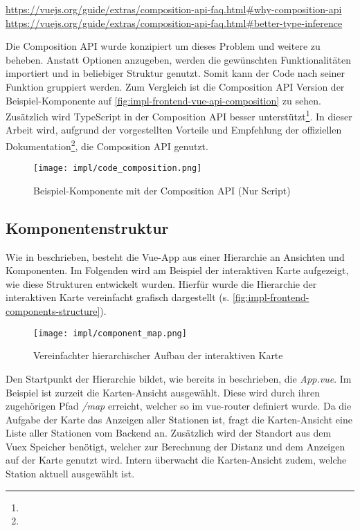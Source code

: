 \urldef\vuecomp\url{https://vuejs.org/guide/extras/composition-api-faq.html#why-composition-api}
\urldef\vuets\url{https://vuejs.org/guide/extras/composition-api-faq.html#better-type-inference}

Die Composition API wurde konzipiert um dieses Problem und weitere zu beheben.
Anstatt Optionen anzugeben, werden die gewünschten Funktionalitäten importiert
und in beliebiger Struktur genutzt. Somit kann der Code nach seiner Funktion
gruppiert werden. Zum Vergleich ist die Composition API Version der
Beispiel-Komponente auf \autoref{fig:impl-frontend-vue-api-composition} zu
sehen. Zusätzlich wird TypeScript in der Composition API besser
unterstützt\footnote{\vuets}. In dieser Arbeit wird, aufgrund der vorgestellten
Vorteile und Empfehlung der offiziellen Dokumentation\footnote{\vuecomp}, die
Composition API genutzt.

\begin{figure}[htpb]
    \centering
    \texttt{[image: impl/code\_composition.png]}
    \caption{Beispiel-Komponente mit der Composition API (Nur Script)}
    \label{fig:impl-frontend-vue-api-composition}
\end{figure}


\subsection{Komponentenstruktur}

Wie in  beschrieben, besteht die Vue-App
aus einer Hierarchie an Ansichten und Komponenten. Im Folgenden wird am Beispiel
der interaktiven Karte aufgezeigt, wie diese Strukturen entwickelt wurden.
Hierfür wurde die Hierarchie der interaktiven Karte vereinfacht grafisch
dargestellt (s. \autoref{fig:impl-frontend-components-structure}).

\begin{figure}[htpb]
    \centering
    \texttt{[image: impl/component\_map.png]}
    \caption{Vereinfachter hierarchischer Aufbau der interaktiven Karte}
    \label{fig:impl-frontend-components-structure}
\end{figure}

Den Startpunkt der Hierarchie bildet, wie bereits in
 beschrieben, die \textit{App.vue}. Im
Beispiel ist zurzeit die Karten-Ansicht ausgewählt. Diese wird durch ihren
zugehörigen Pfad \textit{/map} erreicht, welcher so im vue-router definiert
wurde. Da die Aufgabe der Karte das Anzeigen aller Stationen ist, fragt die
Karten-Ansicht eine Liste aller Stationen vom Backend an. Zusätzlich wird der
Standort aus dem Vuex Speicher benötigt, welcher zur Berechnung der Distanz und
dem Anzeigen auf der Karte genutzt wird. Intern überwacht die Karten-Ansicht
zudem, welche Station aktuell ausgewählt ist.

